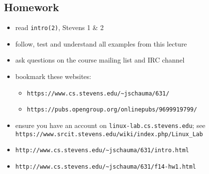 \documentclass[xga]{xdvislides}
\begin{document}
\subsection{Homework}
\begin{itemize}
	\item read {\tt intro(2)}, Stevens 1 \& 2
	\item follow, test and understand all examples from this lecture
	\item ask questions on the course mailing list and IRC channel
	\item bookmark these websites:
		\begin{itemize}
			\item {\tt https://www.cs.stevens.edu/\~{}jschauma/631/}
			\item {\tt https://pubs.opengroup.org/onlinepubs/9699919799/}
		\end{itemize}
	\item ensure you have an account on {\tt linux-lab.cs.stevens.edu}; see \\
		{\tt https://www.srcit.stevens.edu/wiki/index.php/Linux\_Lab}
	\vspace{.5in}
	\item {\tt http://www.cs.stevens.edu/\~{}jschauma/631/intro.html}
	\item {\tt http://www.cs.stevens.edu/\~{}jschauma/631/f14-hw1.html}
\end{itemize}
\end{document}
